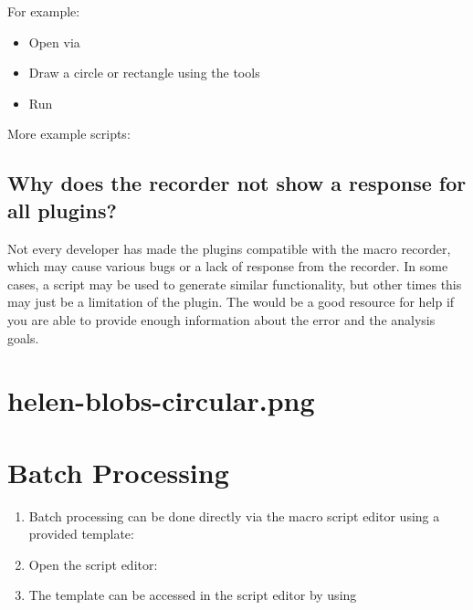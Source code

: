 \documentclass[letterpaper,10pt,english]{jupyterBook}
\begin{document}
\sphinxAtStartPar
For example:
\begin{itemize}
\item {} 
\sphinxAtStartPar
Open  via 

\item {} 
\sphinxAtStartPar
Draw a circle or rectangle using the tools

\item {} 
\sphinxAtStartPar
Run 

\end{itemize}

\sphinxAtStartPar
{}

\sphinxAtStartPar
More example scripts:\\


\subsection{Why does the recorder not show a response for all plugins?}
\label{\detokenize{basic-scripting:why-does-the-recorder-not-show-a-response-for-all-plugins}}
\sphinxAtStartPar
Not every developer has made the plugins compatible with the macro recorder, which
may cause various bugs or a lack of response from the recorder. In some cases, a script may be
used to generate similar functionality, but other times this may just be a limitation of the plugin.
The  would be a good resource for help if you are able to provide enough
information about the error and the analysis goals.


\section[]{\lowercase{\sphinxincludegraphics}{{helen-blobs-circular}.png}}
\label{\detokenize{basic-scripting:id1}}

\section{Batch Processing}
\label{\detokenize{basic-scripting:batch-processing}}\begin{enumerate}
%
\item {} 
\sphinxAtStartPar
Batch processing can be done directly via the macro script editor using a provided template:

\item {} 
\sphinxAtStartPar
Open the script editor: 

\item {} 
\sphinxAtStartPar
The template can be accessed in the script editor by using  

\end{enumerate}
\end{document}
